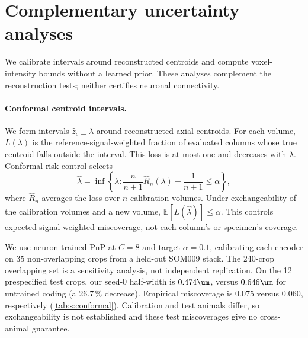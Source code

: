 \section{Complementary uncertainty analyses}
\label{sec:s:uncertainty}

We calibrate intervals around reconstructed centroids and compute voxel-intensity bounds without a learned prior. These analyses complement the reconstruction tests; neither certifies neuronal connectivity.

\paragraph{Conformal centroid intervals.}
We form intervals $\hat z_c\pm\lambda$ around reconstructed axial centroids. For each volume, $L(\lambda)$ is the reference-signal-weighted fraction of evaluated columns whose true centroid falls outside the interval. This loss is at most one and decreases with $\lambda$. Conformal risk control \cite{angelopoulos2024crc} selects
\begin{equation}
\hat\lambda=\inf\left\{\lambda:\frac{n}{n+1}\hat R_n(\lambda)+\frac1{n+1}\le\alpha\right\},
\end{equation}
where $\hat R_n$ averages the loss over $n$ calibration volumes. Under exchangeability of the calibration volumes and a new volume, $\mathbb E[L(\hat\lambda)]\le\alpha$. This controls expected signal-weighted miscoverage, not each column's or specimen's coverage.

We use neuron-trained PnP at $C=8$ and target $\alpha=0.1$, calibrating each encoder on 35 non-overlapping crops from a held-out SOM009 stack. The 240-crop overlapping set is a sensitivity analysis, not independent replication. On the 12 prespecified test crops, our seed-0 half-width is $0.474\um$, versus $0.646\um$ for untrained coding (a 26.7\,\% decrease). Empirical miscoverage is 0.075 versus 0.060, respectively (\cref{tab:s:conformal}). Calibration and test animals differ, so exchangeability is not established and these test miscoverages give no cross-animal guarantee.

\begin{table}[t]
\centering\small
\coltab{}
\caption{Calibrated centroid half-widths and empirical signal-weighted test miscoverage. The 240-crop analysis reuses overlapping regions. Seed 1 gives $0.486\um$ on the primary 35-crop calibration set.}
\label{tab:s:conformal}
\end{table}

